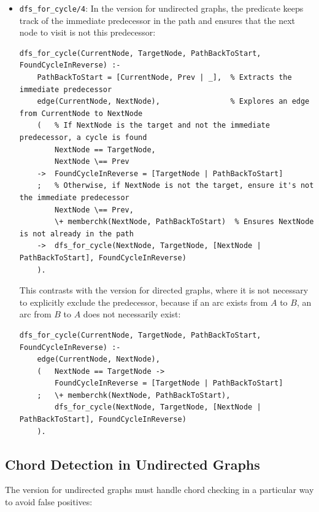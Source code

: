 \documentclass[12pt,a4paper]{article}
\begin{document}
\begin{itemize}
\item \texttt{dfs\_for\_cycle/4}: In the version for undirected graphs, the predicate keeps track of the immediate predecessor in the path and ensures that the next node to visit is not this predecessor:

\begin{lstlisting}[style=prologstyle, basicstyle=\ttfamily\footnotesize]
dfs_for_cycle(CurrentNode, TargetNode, PathBackToStart, FoundCycleInReverse) :-
    PathBackToStart = [CurrentNode, Prev | _],  % Extracts the immediate predecessor
    edge(CurrentNode, NextNode),                % Explores an edge from CurrentNode to NextNode
    (   % If NextNode is the target and not the immediate predecessor, a cycle is found
        NextNode == TargetNode,
        NextNode \== Prev
    ->  FoundCycleInReverse = [TargetNode | PathBackToStart]
    ;   % Otherwise, if NextNode is not the target, ensure it's not the immediate predecessor
        NextNode \== Prev,
        \+ memberchk(NextNode, PathBackToStart)  % Ensures NextNode is not already in the path
    ->  dfs_for_cycle(NextNode, TargetNode, [NextNode | PathBackToStart], FoundCycleInReverse)
    ).
\end{lstlisting}

This contrasts with the version for directed graphs, where it is not necessary to explicitly exclude the predecessor, because if an arc exists from $A$ to $B$, an arc from $B$ to $A$ does not necessarily exist:

\begin{lstlisting}[style=prologstyle, basicstyle=\ttfamily\footnotesize]
dfs_for_cycle(CurrentNode, TargetNode, PathBackToStart, FoundCycleInReverse) :-
    edge(CurrentNode, NextNode),
    (   NextNode == TargetNode ->
        FoundCycleInReverse = [TargetNode | PathBackToStart]
    ;   \+ memberchk(NextNode, PathBackToStart),
        dfs_for_cycle(NextNode, TargetNode, [NextNode | PathBackToStart], FoundCycleInReverse)
    ).
\end{lstlisting}
\end{itemize}

\subsection{Chord Detection in Undirected Graphs}
The version for undirected graphs must handle chord checking in a particular way to avoid false positives:
\end{document}
